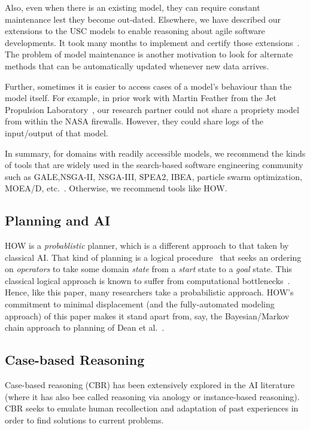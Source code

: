 \documentclass[conference]{IEEEtran}
\begin{document}
Also, even when there is an existing model, they can require
constant  maintenance lest they become out-dated. Elsewhere, we have described our
extensions to the USC models to enable reasoning about agile software developments. 
It took many months to implement and certify those extensions~\cite{me09i,me09j}.
The problem of model maintenance is another
motivation to look for alternate methods that can be automatically updated whenever new data arrives.

Further, sometimes  it is easier to access cases of a model's behaviour than the model
itself. For example, in prior work with Martin  Feather from the Jet Propulsion
Laboratory~\cite{fea02a},  our research partner could not share a
propriety model from within the NASA firewalls. However, they could share 
logs of the input/output of that model.

In summary, for domains with readily accessible models, we recommend
the kinds of tools that are widely used in the search-based
software engineering community such as GALE,NSGA-II, NSGA-III, SPEA2, IBEA, particle swarm optimization, MOEA/D, etc.~\cite{krall14,deb00a,zit02,zit04,%
deb14,Cui2005a,zhang07:TEC}. Otherwise, we recommend tools like HOW.


\subsection{Planning and AI}
HOW is a {\em probablistic} planner, which is a different approach to that taken by
classical AI. 
That kind of planning is a logical procedure~\cite{Fikes1971}
that seeks an ordering on {\em operators} to take some domain
{\em state} from a {\em start} state to a {\em goal} state.
This classical logical approach is known to suffer from
computational bottlenecks~\cite{Bylander1994}. Hence,
like this paper,
many researchers take a probabilistic approach.
HOW's commitment to minimal displacement (and the fully-automated
modeling approach) of this paper makes it stand apart from, say,
  the Bayesian/Markov chain approach to planning of Dean et al.~\cite{dean1995planning}.

\subsection{Case-based Reasoning}
Case-based reasoning (CBR) has been extensively
explored in the AI literature
(where it has also bee called
 reasoning via anology or instance-based reasoning).
CBR seeks to emulate human recollection and adaptation
of past experiences in order to find solutions to current
problems. 
\end{document}
